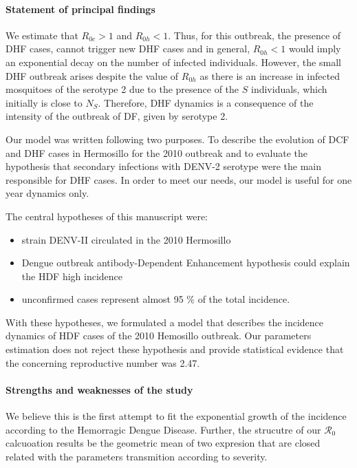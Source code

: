    \paragraph{Statement of principal findings}
        We estimate that $R_{0c}>1$ and  $R_{0h}<1$. Thus, for this outbreak, 
    the presence of DHF cases, cannot trigger new DHF cases 
    and in general, $R_{0h}<1$ would imply an exponential decay on the number 
    of infected individuals. However,
    the small DHF outbreak arises despite the value of $R_{0h}$ as
    there is an increase in infected mosquitoes of the serotype 2 due
    to the presence of the $S$ individuals, which initially is close
    to $N_S$. Therefore, DHF dynamics is a consequence of the
    intensity of the outbreak of DF, given by serotype 2.

        Our model was written following two purposes. To describe the
    evolution of DCF and DHF cases in Hermosillo for the 2010 outbreak and
    to evaluate the hypothesis that secondary infections with DENV-2
    serotype were the main responsible for DHF cases. In order to meet our
    needs, our  model is useful for one year dynamics only.    

        The central hypotheses of this manuscript were:
        \begin{itemize}
            \item
                strain DENV-II circulated in the 2010 Hermosillo 
            \item
                Dengue outbreak antibody-Dependent Enhancement hypothesis
                could explain the HDF high incidence 
            \item
                unconfirmed cases represent almost 95 \% of the total
                incidence.
        \end{itemize}
        With these hypotheses, we formulated a model that describes
    the incidence dynamics of HDF cases of the 2010 Hemosillo outbreak.
    Our parameters estimation does not reject these hypothesis and provide
    statistical evidence that the concerning reproductive number was \num{2.47}.
    
    \paragraph{Strengths and weaknesses of the study}
        We believe this is the first attempt to fit the exponential 
    growth of the incidence according to the Hemorragic Dengue Disease. 
    Further, the strucutre of our $\mathcal{R}_0$ calcuoation results be 
    the geometric mean of two expresion that are closed related 
    with the parameters transmition according to severity.  
    
